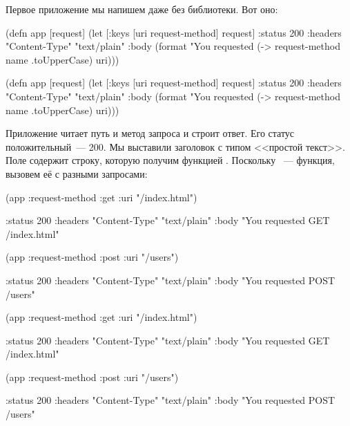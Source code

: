 Первое приложение мы напишем даже без библиотеки. Вот оно:


\label{first-handler}

\ifnarrow

\begin{clojure}
(defn app [request]
 (let [{:keys [uri request-method]}
       request]
  {:status 200
   :headers {"Content-Type" "text/plain"}
   :body (format "You requested %
           (-> request-method
               name
               .toUpperCase)
           uri)}))
\end{clojure}

\else

\begin{clojure}
(defn app [request]
  (let [{:keys [uri request-method]} request]
    {:status 200
     :headers {"Content-Type" "text/plain"}
     :body (format "You requested %
                   (-> request-method name .toUpperCase)
                   uri)}))
\end{clojure}

\fi

Приложение читает путь и метод запроса и строит ответ. Его статус
положительный~--- 200. Мы выставили заголовок с типом <<простой текст>>. Поле
 содержит строку, которую получим функцией . Поскольку
~--- функция, вызовем её с разными запросами:

\ifnarrow

\begin{clojure}
(app {:request-method :get
      :uri "/index.html"})

{:status 200
 :headers {"Content-Type" "text/plain"}
 :body "You requested GET /index.html"}

(app {:request-method :post
      :uri "/users"})

{:status 200
 :headers {"Content-Type" "text/plain"}
 :body "You requested POST /users"}
\end{clojure}

\else

\begin{clojure}
(app {:request-method :get :uri "/index.html"})

{:status 200
 :headers {"Content-Type" "text/plain"}
 :body "You requested GET /index.html"}
\end{clojure}

\begin{clojure}
(app {:request-method :post :uri "/users"})

{:status 200
 :headers {"Content-Type" "text/plain"}
 :body "You requested POST /users"}
\end{clojure}

